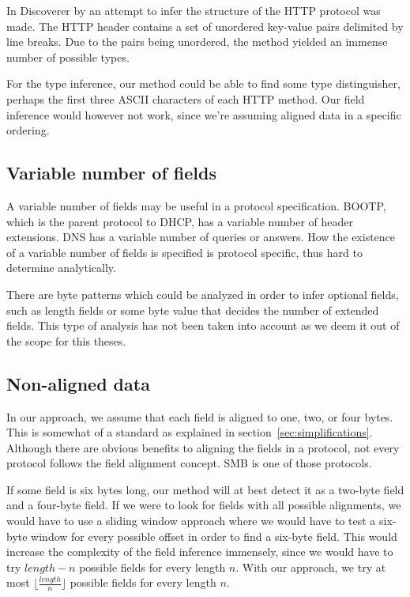 \documentclass[a4paper]{report}
\begin{document}
In Discoverer by \citeauthor{cui07} an attempt to infer the structure of
the HTTP protocol was made. The HTTP header contains a set of unordered
key-value pairs delimited by line breaks. Due to the pairs being unordered,
the method yielded an immense number of possible types.

For the type inference, our method could be able to find some type 
distinguisher, perhaps the first three ASCII characters of each HTTP method.
Our field inference would however not work, since we're assuming aligned
data in a specific ordering.

\subsection{Variable number of fields}
A variable number of fields may be useful in a protocol specification. BOOTP,
which is the parent protocol to DHCP, has a variable number of header 
extensions. DNS has a variable number of queries or answers. How the existence
of a variable number of fields is specified is protocol specific, thus hard to
determine analytically. 

There are byte patterns which could be analyzed in order to infer optional
fields, such as length fields or some byte value that decides the number of
extended fields. This type of analysis has not been taken into account as we
deem it out of the scope for this theses.

\subsection{Non-aligned data}
In our approach, we assume that each field is aligned to one, two, or four
bytes. This is somewhat of a standard as explained in
section~\ref{sec:simplifications}. Although there are obvious benefits to
aligning the fields in a protocol, not every protocol follows the field
alignment concept. SMB is one of those protocols.

If some field is six bytes long, our method will at best detect it as a
two-byte field and a four-byte field. If we were to look for fields with
all possible alignments, we would have to use a sliding window approach where
we would have to test a six-byte window for every possible offset in order
to find a six-byte field. This would increase the complexity of the field
inference immensely, since we would have to try $length - n$ possible fields
for every length $n$. With our approach, we try at most
$\lfloor \frac{length}{n} \rfloor$ possible fields for every length $n$.
\end{document}
